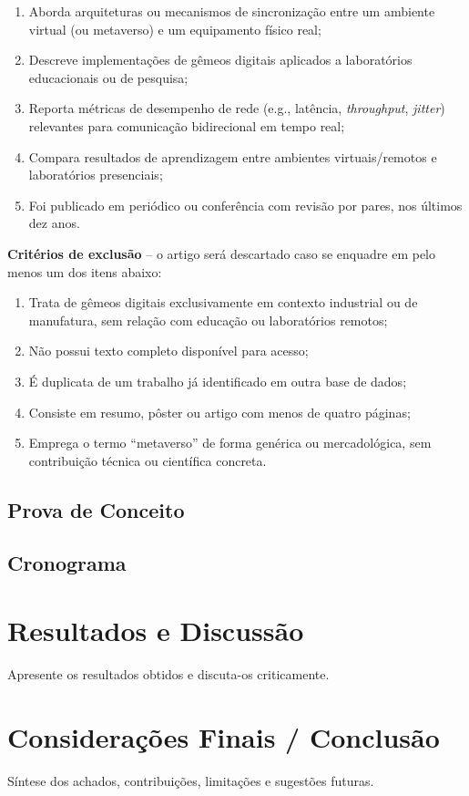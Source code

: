 \documentclass[12pt]{article}
\begin{document}
\begin{enumerate}
    \item Aborda arquiteturas ou mecanismos de sincronização entre um ambiente virtual (ou metaverso) e um equipamento físico real;
    \item Descreve implementações de gêmeos digitais aplicados a laboratórios educacionais ou de pesquisa;
    \item Reporta métricas de desempenho de rede (e.g., latência, \textit{throughput}, \textit{jitter}) relevantes para comunicação bidirecional em tempo real;
    \item Compara resultados de aprendizagem entre ambientes virtuais/remotos e laboratórios presenciais;
    \item Foi publicado em periódico ou conferência com revisão por pares, nos últimos dez anos.
\end{enumerate}

\textbf{Critérios de exclusão} -- o artigo será descartado caso se enquadre em pelo menos um dos itens abaixo:

\begin{enumerate}
    \item Trata de gêmeos digitais exclusivamente em contexto industrial ou de manufatura, sem relação com educação ou laboratórios remotos;
    \item Não possui texto completo disponível para acesso;
    \item É duplicata de um trabalho já identificado em outra base de dados;
    \item Consiste em resumo, pôster ou artigo com menos de quatro páginas;
    \item Emprega o termo ``metaverso'' de forma genérica ou mercadológica, sem contribuição técnica ou científica concreta.
\end{enumerate}

\subsection{Prova de Conceito}

\subsection{Cronograma}

\section{Resultados e Discussão}

Apresente os resultados obtidos e discuta-os criticamente.


\section{Considerações Finais / Conclusão}

Síntese dos achados, contribuições, limitações e sugestões futuras.

\newpage
 
\end{document}
